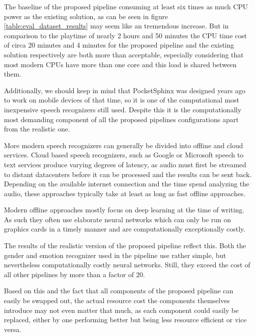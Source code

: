 { %
The baseline of the proposed pipeline consuming at least six times as much CPU power as the existing solution, as can be seen in figure \ref{table:eval_dataset_results} may seem like an tremendous increase.
But in comparison to the playtime of nearly 2 hours and 50 minutes the CPU time cost of circa 20 minutes and 4 minutes for the proposed pipeline and the existing solution respectively are both more than acceptable, especially considering that most modern CPUs have more than one core and this load is shared between them.

Additionally, we should keep in mind that PocketSphinx was designed years ago to work on mobile devices of that time, so it is one of the computational most inexpensive speech recognizers still used. 
Despite this it is the computationally most demanding component of all the proposed pipelines configurations apart from the realistic one.

More modern speech recognizers can generally be divided into offline and cloud services.
Cloud based speech recognizers, such as Google \cite{GoogleSpeech} or Microsoft \cite{MicrosoftSpeech} speech to text services produce varying degrees of latency, as audio must first be streamed to distant datacenters before it can be processed and the results can be sent back.
Depending on the available internet connection and the time spend analyzing the audio, these approaches typically take at least as long as fast offline approaches.

Modern offline approaches mostly focus on deep learning at the time of writing. %
As such they often use elaborate neural networks which can only be run on graphics cards in a timely manner and are computationally exceptionally costly.

The results of the realistic version of the proposed pipeline reflect this.
Both the gender and emotion recognizer used in the pipeline use rather simple, but nevertheless computationally costly neural networks.
Still, they exceed the cost of all other pipelines by more than a factor of 20.

Based on this and the fact that all components of the proposed pipeline can easily be swapped out, the actual resource cost the components themselves introduce may not even matter that much, as each component could easily be replaced, either by one performing better but being less resource efficient or vice versa.
}


